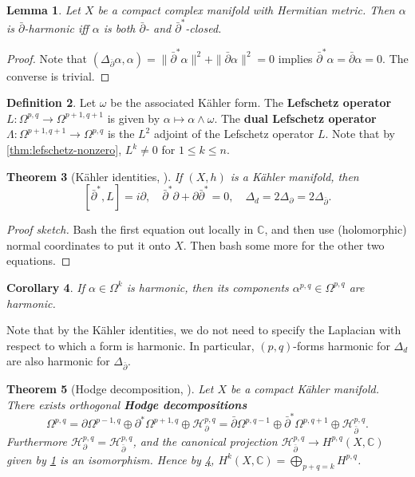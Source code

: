 \documentclass{report}
\theoremstyle{plain}
\newtheorem{theorem}{Theorem}[section]
\newtheorem{lemma}[theorem]{Lemma}
\newtheorem{corollary}[theorem]{Corollary}
\theoremstyle{definition}
\newtheorem{definition}[theorem]{Definition}
\theoremstyle{remark}
\newcommand{\di}{\partial}
\newcommand{\bC}{\mathbb{C}}
\newcommand{\cH}{\mathcal{H}}
\newcommand{\bdi}{\bar{\di}}
\begin{document}
\begin{lemma} \label{thm:harmonic-implies-closed}
  Let $X$ be a compact complex manifold with Hermitian metric. Then
  $\alpha$ is $\bdi$-harmonic iff $\alpha$ is both $\bdi$- and
  $\bdi^*$-closed.
\end{lemma}

\begin{proof}
  Note that $(\Delta_{\bdi}\alpha, \alpha) = \|\bdi^*\alpha\|^2 +
  \|\bdi\alpha\|^2 = 0$ implies $\bdi^*\alpha = \bdi\alpha = 0$. The
  converse is trivial.
\end{proof}

\begin{definition}
  Let $\omega$ be the associated K\"ahler form. The {\bf Lefschetz
    operator} $L\colon \Omega^{p,q} \to \Omega^{p+1,q+1}$ is given by
  $\alpha \mapsto \alpha \wedge \omega$. The {\bf dual Lefschetz
    operator} $\Lambda\colon \Omega^{p+1,q+1} \to \Omega^{p,q}$ is the
  $L^2$ adjoint of the Lefschetz operator $L$. Note that by
  \ref{thm:lefschetz-nonzero}, $L^k \neq 0$ for $1 \le k \le n$.
\end{definition}

\begin{theorem}[K\"ahler identities, {\cite[Section 6.1]{Voisin2002}}] \label{thm:kahler-identities}
  If $(X, h)$ is a K\"ahler manifold, then
  \[ [\bdi^*, L] = i\di, \quad \bdi^* \di + \di \bdi^* = 0, \quad \Delta_d = 2\Delta_\di = 2\Delta_{\bdi}. \]
\end{theorem}

\begin{proof}[Proof sketch]
  Bash the first equation out locally in $\bC$, and then use
  (holomorphic) normal coordinates to put it onto $X$. Then bash some
  more for the other two equations.
\end{proof}

\begin{corollary} \label{thm:harmonic-components}
  If $\alpha \in \Omega^k$ is harmonic, then its components
  $\alpha^{p,q} \in \Omega^{p,q}$ are harmonic.
\end{corollary}

Note that by the K\"ahler identities, we do not need to specify the
Laplacian with respect to which a form is harmonic. In particular,
$(p,q)$-forms harmonic for $\Delta_d$ are also harmonic for
$\Delta_{\bdi}$.

\begin{theorem}[Hodge decomposition, {\cite[Theorem 3.2.8]{Huybrechts2005}}] \label{thm:hodge-decomposition}
  Let $X$ be a compact K\"ahler manifold. There exists orthogonal {\bf
    Hodge decompositions}
  \[ \Omega^{p,q} = \di \Omega^{p-1,q} \oplus \di^* \Omega^{p+1,q} \oplus \cH^{p,q}_{\di} = \bdi \Omega^{p,q-1} \oplus \bdi^* \Omega^{p,q+1} \oplus \cH^{p,q}_{\bdi}. \]
  Furthermore $\cH^{p,q}_{\di} = \cH^{p,q}_{\bdi}$, and the canonical
  projection $\cH^{p,q}_{\bdi} \to H^{p,q}(X, \bC)$ given by
  \ref{thm:harmonic-implies-closed} is an isomorphism. Hence by
  \ref{thm:harmonic-components}, $H^k(X, \bC) = \bigoplus_{p+q=k}
  H^{p,q}$.
\end{theorem}
\end{document}
